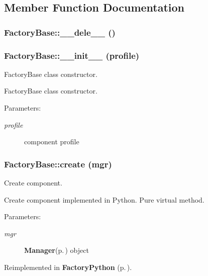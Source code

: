 \subsection{Member Function Documentation}
\subsubsection{\setlength{\rightskip}{0pt plus 5cm}Factory\-Base::\_\-\_\-dele\_\-\_\- ()}\label{classFactoryBase_FactoryPythona4}


\subsubsection{\setlength{\rightskip}{0pt plus 5cm}Factory\-Base::\_\-\_\-init\_\-\_\- (profile)}\label{classFactoryBase_FactoryPythona3}


Factory\-Base class constructor. 

Factory\-Base class constructor. \begin{Desc}
\item[Parameters:]
\begin{description}
\item[{\em profile}]component profile\end{description}
\end{Desc}
\subsubsection{\setlength{\rightskip}{0pt plus 5cm}Factory\-Base::create (mgr)}\label{classFactoryBase_FactoryBasea2}


Create component. 

Create component implemented in Python. Pure virtual method. \begin{Desc}
\item[Parameters:]
\begin{description}
\item[{\em mgr}]{\bf Manager}{\rm (p.\,\pageref{classManager})} object\end{description}
\end{Desc}


Reimplemented in {\bf Factory\-Python} {\rm (p.\,\pageref{classFactoryPython_FactoryPythona1})}.
